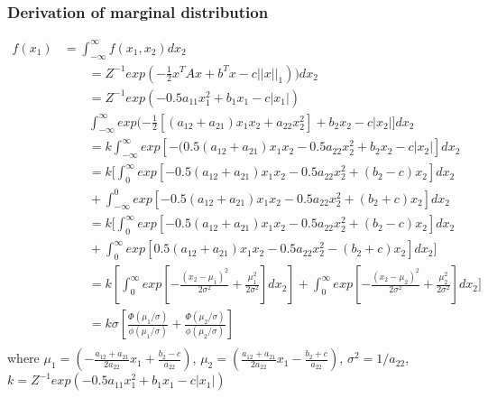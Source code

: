 \subsubsection{Derivation of marginal distribution}
$$
\begin{array}{rl}
	f(x_1)
	& =  \int_{-\infty}^{\infty} f(x_1,x_2)dx_2 \\
	& \qquad
	= Z^{-1}exp(-\frac{1}{2}x^TAx + b^Tx - c||x||_1))dx_2 \\
	& \qquad
	= Z^{-1}exp(-0.5a_{11}x_1^2  + b_1x_1 - c|x_1|) \\
	& \qquad
	\int_{-\infty}^{\infty}exp(-\frac{1}{2} [(a_{12}+a_{21})x_1x_2 + a_{22}x_2^2] + b_2x_2 - c|x_2|]dx_2\\
	& \qquad
	= k \int_{-\infty}^{\infty} exp[-(0.5(a_{12}+a_{21})x_1x_2 -0.5a_{22}x_2^2 + b_2x_2 - c|x_2|]dx_2\\
	& \qquad
	= k[ \int_{0}^{\infty} exp[-0.5(a_{12}+a_{21})x_1x_2 - 0.5a_{22}x_2^2 + (b_2 - c)x_2 ]dx_2  \\
	& \qquad
	+\int_{-\infty}^{0} exp[-0.5(a_{12}+a_{21})x_1x_2  - 0.5a_{22}x_2^2  + (b_2+c)x_2]dx_2 \\
	& \qquad
	= k[ \int_{0}^{\infty} exp[-0.5(a_{12}+a_{21})x_1x_2 - 0.5a_{22}x_2^2 + (b_2 - c)x_2 ]dx_2  \\
	& \qquad
	+\int_{0}^{\infty} exp[0.5(a_{12}+a_{21})x_1x_2  - 0.5a_{22}x_2^2  - (b_2+ c)x_2]dx_2 ]\\
	& \qquad
	= k[\int_{0}^{\infty} exp[-\frac{(x_2-\mu_1)^2}{2\sigma^2} + \frac{\mu_1^2}{2\sigma^2}]dx_2] + \int_{0}^{\infty} exp[-\frac{(x_2-\mu_2)^2}{2\sigma^2} + \frac{\mu_2^2}{2\sigma^2}]dx_2] \\
	& \qquad
	= k \sigma[\frac{\Phi(\mu_1/\sigma)}{\phi(\mu_1/\sigma)} +
	\frac{\Phi(\mu_2/\sigma)}{\phi(\mu_2/\sigma)}]  \\
	
\end{array}
$$
where $\mu_1 = (-\frac{a_{12}+a_{21}}{2a_{22}}x_1 + \frac{b_2-c}{a_{22}}) $, $\mu_2 =(\frac{a_{12}+a_{21}}{2a_{22}}x_1 - \frac{b_2+c}{a_{22}}) $, $\sigma^2 = 1/a_{22}$, $k =  Z^{-1}exp(-0.5a_{11}x_1^2 + b_1x_1 - c|x_1|)$

